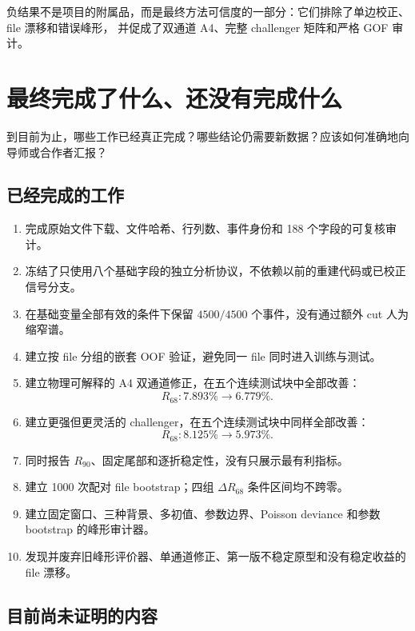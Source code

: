 \documentclass[UTF8,12pt,a4paper,oneside,fontset=none]{ctexart}
\numberwithin{equation}{section}
\newcommand{\Rsixtyeight}{R_{68}}
\newcommand{\Rninety}{R_{90}}
\begin{document}
\begin{conclusionbox}
负结果不是项目的附属品，而是最终方法可信度的一部分：它们排除了单边校正、file 漂移和错误峰形，
并促成了双通道 A4、完整 challenger 矩阵和严格 GOF 审计。
\end{conclusionbox}

\section{最终完成了什么、还没有完成什么}
\label{sec:final}

\begin{questionbox}
到目前为止，哪些工作已经真正完成？哪些结论仍需要新数据？应该如何准确地向导师或合作者汇报？
\end{questionbox}

\subsection{已经完成的工作}

\begin{enumerate}[label=\arabic*.]
  \item 完成原始文件下载、文件哈希、行列数、事件身份和 188 个字段的可复核审计。
  \item 冻结了只使用八个基础字段的独立分析协议，不依赖以前的重建代码或已校正信号分支。
  \item 在基础变量全部有效的条件下保留 \(4500/4500\) 个事件，没有通过额外 cut 人为缩窄谱。
  \item 建立按 file 分组的嵌套 OOF 验证，避免同一 file 同时进入训练与测试。
  \item 建立物理可解释的 A4 双通道修正，在五个连续测试块中全部改善：
  \[
  \Rsixtyeight:7.893\%\longrightarrow6.779\%.
  \]
  \item 建立更强但更灵活的 challenger，在五个连续测试块中同样全部改善：
  \[
  \Rsixtyeight:8.125\%\longrightarrow5.973\%.
  \]
  \item 同时报告 \(\Rninety\)、固定尾部和逐折稳定性，没有只展示最有利指标。
  \item 建立 1000 次配对 file bootstrap；四组 \(\Delta\Rsixtyeight\) 条件区间均不跨零。
  \item 建立固定窗口、三种背景、多初值、参数边界、Poisson deviance 和参数 bootstrap 的峰形审计器。
  \item 发现并废弃旧峰形评价器、单通道修正、第一版不稳定原型和没有稳定收益的 file 漂移。
\end{enumerate}

\subsection{目前尚未证明的内容}
\end{document}

